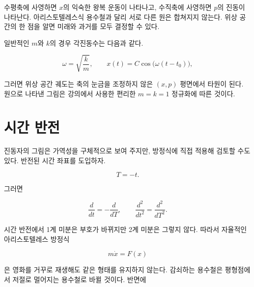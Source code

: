 수평축에 사영하면 \(x\)의 익숙한 왕복 운동이 나타나고, 수직축에 사영하면 \(p\)의 진동이 나타난다. 아리스토텔레스식 용수철과 달리 서로 다른 원은 합쳐지지 않는다. 위상 공간의 한 점을 알면 미래와 과거를 모두 결정할 수 있다.

일반적인 \(m\)와 \(k\)의 경우 각진동수는 다음과 같다.

\begin{equation}
  \omega=\sqrt{\frac{k}{m}},
  \qquad
  x(t)=C\cos\bigl(\omega(t-t_0)\bigr),
  \label{eq:general-oscillator-frequency}
\end{equation}

그러면 위상 공간 궤도는 축의 눈금을 조정하지 않은 \((x,p)\) 평면에서 타원이 된다. 원으로 나타낸 그림은 강의에서 사용한 편리한 \(m=k=1\) 정규화에 따른 것이다.

\begin{classroomqa}\end{classroomqa}

\section{시간 반전}

진동자의 그림은 가역성을 구체적으로 보여 주지만, 방정식에 직접 적용해 검토할 수도 있다. 반전된 시간 좌표를 도입하자.

\begin{equation}
  T=-t.
  \label{eq:reverse-time}
\end{equation}

그러면

\begin{equation}
  \frac{d}{dt}=-\frac{d}{dT},
  \qquad
  \frac{d^2}{dt^2}=\frac{d^2}{dT^2}.
  \label{eq:time-derivative-parity}
\end{equation}

시간 반전에서 1계 미분은 부호가 바뀌지만 2계 미분은 그렇지 않다. 따라서 자율적인 아리스토텔레스 방정식

\begin{equation}
  m\dot x=F(x)
  \label{eq:aristotle-time-reversal}
\end{equation}

은 영화를 거꾸로 재생해도 같은 형태를 유지하지 않는다. 감쇠하는 용수철은 평형점에서 저절로 멀어지는 용수철로 바뀔 것이다. 반면에

